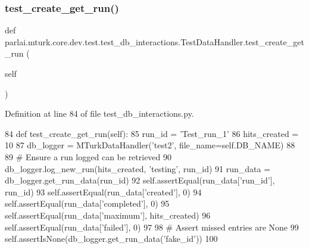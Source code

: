 \subsubsection{\texorpdfstring{test\+\_\+create\+\_\+get\+\_\+run()}{test\_create\_get\_run()}}
{\footnotesize\ttfamily def parlai.\+mturk.\+core.\+dev.\+test.\+test\+\_\+db\+\_\+interactions.\+Test\+Data\+Handler.\+test\+\_\+create\+\_\+get\+\_\+run (\begin{DoxyParamCaption}\item[{}]{self }\end{DoxyParamCaption})}



Definition at line 84 of file test\+\_\+db\+\_\+interactions.\+py.


\begin{DoxyCode}
84     \textcolor{keyword}{def }test\_create\_get\_run(self):
85         run\_id = \textcolor{stringliteral}{'Test\_run\_1'}
86         hits\_created = 10
87         db\_logger = MTurkDataHandler(\textcolor{stringliteral}{'test2'}, file\_name=self.DB\_NAME)
88 
89         \textcolor{comment}{# Ensure a run logged can be retrieved}
90         db\_logger.log\_new\_run(hits\_created, \textcolor{stringliteral}{'testing'}, run\_id)
91         run\_data = db\_logger.get\_run\_data(run\_id)
92         self.assertEqual(run\_data[\textcolor{stringliteral}{'run\_id'}], run\_id)
93         self.assertEqual(run\_data[\textcolor{stringliteral}{'created'}], 0)
94         self.assertEqual(run\_data[\textcolor{stringliteral}{'completed'}], 0)
95         self.assertEqual(run\_data[\textcolor{stringliteral}{'maximum'}], hits\_created)
96         self.assertEqual(run\_data[\textcolor{stringliteral}{'failed'}], 0)
97 
98         \textcolor{comment}{# Assert missed entries are None}
99         self.assertIsNone(db\_logger.get\_run\_data(\textcolor{stringliteral}{'fake\_id'}))
100 
\end{DoxyCode}
\mbox{\label{classparlai_1_1mturk_1_1core_1_1dev_1_1test_1_1test__db__interactions_1_1TestDataHandler_a2c2bbca0d524c9c7997dd2e0e8ef576e}} 
